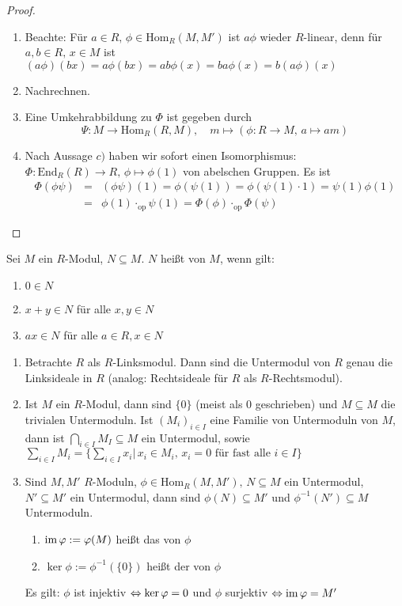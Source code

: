\begin{proof}
	\begin{enumerate}[label=\alph*)]
		\item Beachte: Für $a\in R, \, \phi\in \text{Hom}_R(M, M')$ ist $a\phi$ wieder $R$-linear, denn für $a,b\in R, \, x\in M$ ist $(a\phi)(bx) = a\phi(bx) = ab \phi(x) = ba \phi(x) = b (a\phi)(x)$
		\item Nachrechnen.
		\item Eine Umkehrabbildung zu $\Phi$ ist gegeben durch 
		$$\Psi:M \to \text{Hom}_R(R, M), \quad m \mapsto(\phi:R\to M, \, a \mapsto am)$$
		\item Nach Aussage $c)$ haben wir sofort einen Isomorphismus: $\Phi:\text{End}_R(R) \to R, \, \phi\mapsto \phi(1)$ von abelschen Gruppen. Es ist 
		\begin{eqnarray*}\Phi(\phi \psi) &=& (\phi \psi)(1) = \phi(\psi(1)) = \phi( \psi(1) \cdot 1) = \psi(1) \phi(1)\\
		&=& \phi(1) \cdot_{\text{op}}  \psi(1) = \Phi(\phi) \cdot_\text{op} \Phi(\psi)
		\end{eqnarray*}
	\end{enumerate}
\end{proof}
\begin{df}\label{df1.7}
	Sei $M$ ein $R$-Modul, $N\subseteq M$. $N$ heißt  von $M$, wenn gilt:
	\begin{enumerate}[label= \alph*)]
		\item $0\in N$
		\item $x+y\in N$ für alle $x,y\in N$
		\item $ax\in N$ für alle $a\in R, x\in N$
	\end{enumerate}
\end{df}
\begin{bsp}
	\begin{enumerate}[label=\alph*)]
		\item Betrachte $R$ als $R$-Linksmodul. Dann sind die Untermodul von $R$ genau die Linksideale in $R$ (analog: Rechtsideale für $R$ als $R$-Rechtsmodul).
		\item Ist $M$ ein $R$-Modul, dann sind $\{0\}$ (meist als $0$ geschrieben) und $M\subseteq M$ die trivialen Untermoduln. Ist $(M_i)_{i\in I}$ eine Familie von Untermoduln von $M$, dann ist $\bigcap_{i\in I} M_I\subseteq M$ ein Untermodul, sowie $\sum_{i\in I} M_i = \{\sum_{i\in I} x_i|\, x_i \in M_i, \, x_i=0 \text{ für fast alle } i\in I\}$
		\item Sind $M, M'$ $R$-Moduln, $\phi\in \text{Hom}_R(M, M'), \, N\subseteq M$ ein Untermodul, $N' \subseteq M'$ ein Untermodul, dann sind $\phi(N) \subseteq M'$ und $\phi^{-1}(N') \subseteq M$ Untermoduln. 
		\begin{enumerate}
			\item[] $\operatorname{im} \varphi:= \varphi(M)$ heißt das  von $\phi$
			\item[] $\ker \phi:= \phi^{-1}(\{0\})$ heißt der  von $\phi$
		\end{enumerate}
	Es gilt: $\phi$ ist injektiv $\Leftrightarrow \ker \varphi =0$ und $\phi$ surjektiv $\Leftrightarrow \operatorname{im} \varphi = M'$
	\end{enumerate}
\end{bsp}
